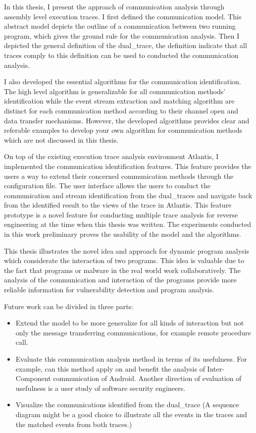 \label{concl}
In this thesis, I present the approach of communication analysis through assembly level execution traces. I first defined the communication model. This abstract model depicts the outline of a communication between two running program, which gives the ground rule for the communication analysis. Then I depicted the general definition of the dual\_trace, the definition indicate that all traces comply to this definition can be used to conducted the communication analysis.

I also developed the essential algorithms for the communication identification. The high level algorithm is generalizable for all communication methods' identification while  the event stream extraction and matching algorithm are distinct for each communication method according to their channel open and data transfer mechanisms. However, the developed algorithms provides clear and referable examples to develop your own algorithm for communication methods which are not discussed in this thesis.

On top of the existing execution trace analysis environment Atlantis, I implemented the communication identification features. This feature provides the users a way to extend their concerned communication methods through the configuration file. The user interface allows the users to conduct the communication and stream identification from the dual\_traces and navigate back from the identified result to the views of the trace in Atlantis. This feature prototype is a novel feature for conducting multiple trace analysis for reverse engineering at the time when this thesis was written. The experiments conducted in this work preliminary proves the usability of the model and the algorithms. 

This thesis illustrates the novel idea and approach for dynamic program analysis which considerate the interaction of two programs. This idea is valuable due to the fact that programs or malware in the real world work collaboratively. The analysis of the communication and interaction of the programs provide more reliable information for vulnerability detection and program analysis.

Future work can be divided in three parts:
\begin{itemize}
\item Extend the model to be more generalize for all kinds of interaction but not only the message transferring communications, for example remote procedure call.
\item Evaluate this communication analysis method in terms of its usefulness. For example, can this method apply on and benefit the analysis of Inter-Component communication of Android. Another direction of evaluation of usefulness is a user study of software security engineers.
\item Visualize the communications identified from the dual\_trace (A sequence diagram might be a good choice to illustrate all the events in the traces and the matched events from both traces.) 
\end{itemize}


